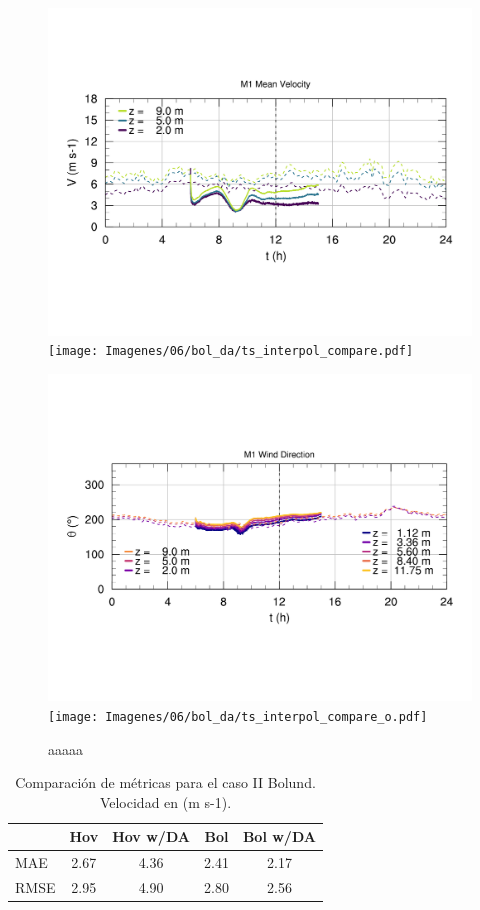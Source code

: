 \begin{figure}[H]
	\centering
	\includegraphics[width=0.5\linewidth,trim={7mm 68mm 10mm 55mm},clip]{Imagenes/06/bol/ts_interpol_compare.pdf}%
	\texttt{[image: Imagenes/06/bol\_da/ts\_interpol\_compare.pdf]}%
	
	\includegraphics[width=0.5\linewidth,trim={12mm 48mm 10mm 55mm},clip]{Imagenes/06/bol/ts_interpol_compare_o.pdf}%
	\texttt{[image: Imagenes/06/bol\_da/ts\_interpol\_compare\_o.pdf]}%
	\caption{aaaaa}
	\label{fig:06_bol_ts_m4}
\end{figure}


\begin{table}[h!]
	\caption{Comparación de métricas para el caso II Bolund. Velocidad en (m s-1).}
	\label{tab:06_bol_mae_rmse}
	\centering%
	\begin{tabular}{lcccc}
		\toprule
		& Hov & Hov w/DA & Bol & Bol w/DA\\
		\midrule
		MAE & 2.67 & 4.36 & 2.41& 2.17\\
		RMSE& 2.95& 4.90 & 2.80& 2.56\\
		\bottomrule
	\end{tabular}
\end{table}